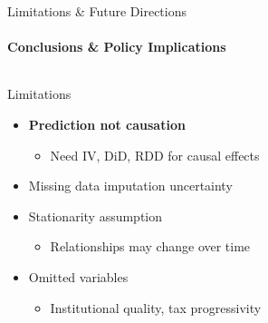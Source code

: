\documentclass[aspectratio=169,8pt]{beamer}
\begin{document}
    \begin{frame}{Limitations \& Future Directions}
        \framesubtitle{Conclusions \& Policy Implications}
        \begin{columns}[totalwidth=\textwidth,T]
            \begin{block}{Limitations}
            \begin{itemize}
                \item \textbf{Prediction not causation}
                \begin{itemize}
                    \item Need IV, DiD, RDD for causal effects
                \end{itemize}
                \item Missing data imputation uncertainty
                \item Stationarity assumption
                \begin{itemize}
                    \item Relationships may change over time
                \end{itemize}
                \item Omitted variables
                \begin{itemize}
                    \item Institutional quality, tax progressivity
                \end{itemize}
            \end{itemize}
            \end{block}


\end{columns}
\end{frame}
\end{document}
